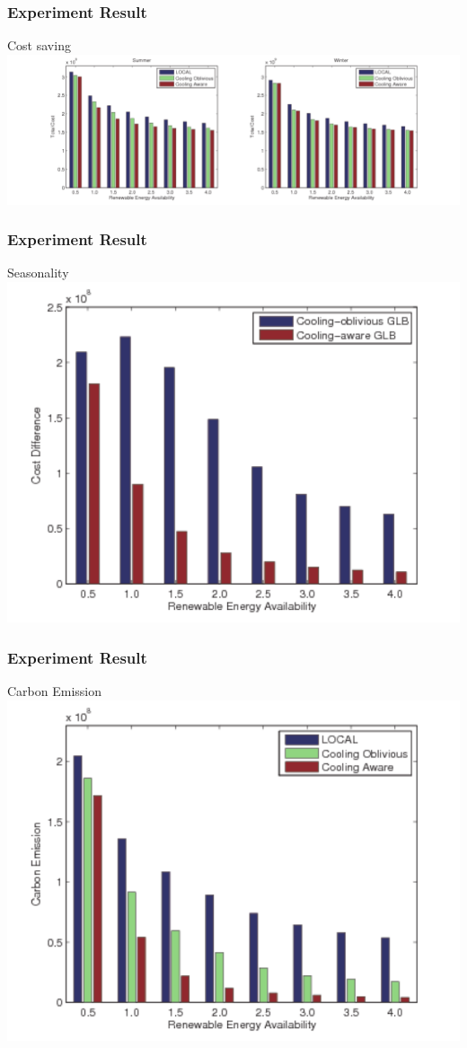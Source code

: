 \documentclass[xcolor=dvipsnames]{beamer}
\begin{document}
\begin{frame}
\frametitle{Experiment Result}
\begin{block}
{Cost saving}
\includegraphics[scale = 0.37]{cost_comparison.pdf}
\end{block}
\end{frame}
%
%
\begin{frame}
\frametitle{Experiment Result}
\begin{block}
{Seasonality}
\includegraphics[scale = 0.5]{cost_diff.pdf}
\end{block}
\end{frame}
%
%
\begin{frame}
\frametitle{Experiment Result}
\begin{block}
{Carbon Emission}
\includegraphics[scale = 0.5]{carbon_summer.pdf}
\end{block}
\end{frame}
\end{document}
